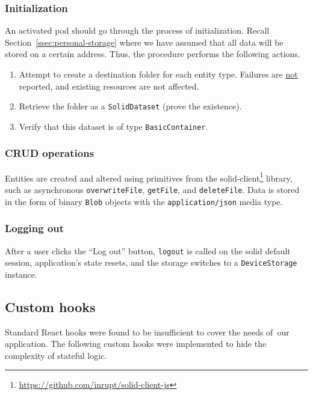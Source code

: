 \subsubsection{Initialization}

An activated pod should go through the process of initialization. Recall Section~\ref{ssec:personal-storage} where we have assumed that all data will be stored on a certain address. Thus, the procedure performs the following actions.

\begin{enumerate}
\item Attempt to create a destination folder for each entity type. Failures are \underline{not} reported, and existing resources are not affected.
\item Retrieve the folder as a \texttt{SolidDataset} (prove the existence).
\item Verify that this dataset is of type \texttt{BasicContainer}.
\end{enumerate}

\subsubsection{CRUD operations}

Entities are created and altered using primitives from the solid-client\footnote{\href{https://github.com/inrupt/solid-client-js}{https://github.com/inrupt/solid-client-js}} library, such as asynchronous \texttt{overwriteFile}, \texttt{getFile}, and \texttt{deleteFile}. Data is stored in the form of binary \texttt{Blob} objects with the \texttt{application/json} media type.

\subsubsection{Logging out}

After a user clicks the ``Log out'' button, \texttt{logout} is called on the \acs{solid} default session, application's state resets, and the storage switches to a \texttt{DeviceStorage} instance.

\subsection{Custom hooks}\label{ssec:custom-hooks}

Standard React hooks were found to be insufficient to cover the needs of~our application. The fol\-low\-ing custom hooks were implemented to hide the com\-plex\-i\-ty of stateful logic.

